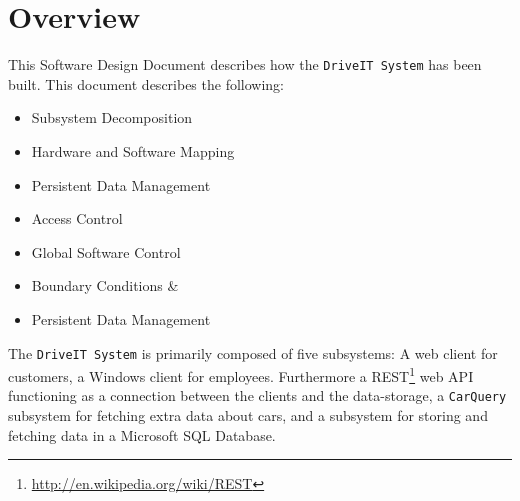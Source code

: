 \section{Overview}
This Software Design Document describes how the \texttt{DriveIT System} has been built.
This document describes the following:
\begin{itemize}
	\item Subsystem Decomposition
	\item Hardware and Software Mapping
	\item Persistent Data Management
	\item Access Control
	\item Global Software Control
	\item Boundary Conditions \&
	\item Persistent Data Management
\end{itemize}
The \texttt{DriveIT System} is primarily composed of five subsystems: 
A web client for customers, a Windows client for employees. Furthermore a REST\footnote{\url{http://en.wikipedia.org/wiki/REST}} web API functioning as a connection between the clients and the data-storage, a \texttt{CarQuery} subsystem for fetching extra data about cars, and a subsystem for storing and fetching data in a Microsoft SQL Database.